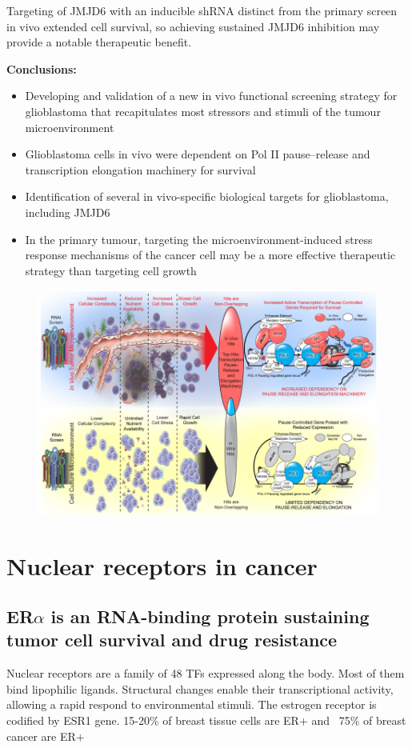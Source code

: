 Targeting of JMJD6 with an inducible shRNA distinct from the primary screen in vivo extended cell survival, so achieving sustained JMJD6 inhibition may provide a notable therapeutic benefit.

\textbf{Conclusions:}
\begin{itemize}
\item Developing and validation of a new in vivo functional screening strategy for glioblastoma that recapitulates most stressors and ­stimuli of the tumour microenvironment
\item Glioblastoma cells in vivo were dependent on Pol II pause–release and transcription elongation machinery for survival
\item Identification of several in vivo-specific biological targets for glioblastoma, including JMJD6
\item In the primary tumour, targeting the microenvironment-induced stress response mechanisms of the cancer cell may be a more effective therapeutic strategy than targeting cell growth
\end{itemize}

\begin{figure}
\centering
\includegraphics[width=\textwidth]{../_resources/RNAi.png}
\caption{}
\end{figure}

\section{Nuclear receptors in cancer}
\subsection{ER$\alpha$ is an RNA-binding protein sustaining tumor cell survival and drug resistance}
Nuclear receptors are a family of 48 TFs expressed along the body. Most of them bind lipophilic ligands.
Structural changes enable their transcriptional activity, allowing a rapid respond to environmental stimuli.
The estrogen receptor is codified by ESR1 gene. 15-20\% of breast tissue cells are ER+ and  ~75\% of breast cancer are ER+ 

